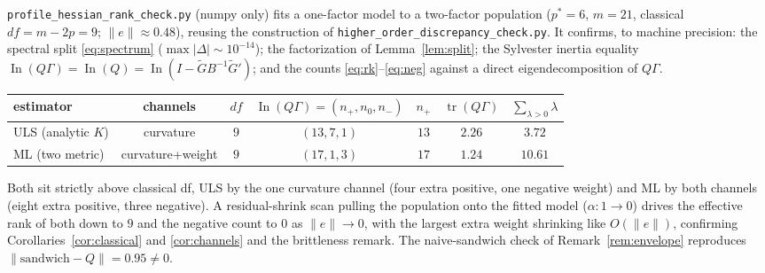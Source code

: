 \documentclass[11pt]{article}
\newcommand{\tr}{\operatorname{tr}}
\newcommand{\In}{\operatorname{In}}
\newcommand{\np}{n_{+}}
\newcommand{\nz}{n_{0}}
\newcommand{\nm}{n_{-}}
\theoremstyle{plain}
\theoremstyle{remark}
\begin{document}
\texttt{profile\_hessian\_rank\_check.py} (numpy only) fits a one-factor model to
a two-factor population ($p^\ast=6$, $m=21$, classical $df=m-2p=9$;
$\lVert e\rVert\approx0.48$), reusing the construction of
\texttt{higher\_order\_discrepancy\_check.py}. It confirms, to machine precision:
the spectral split \eqref{eq:spectrum} ($\max|\Delta|\sim10^{-14}$); the
factorization of Lemma~\ref{lem:split}; the Sylvester inertia equality
$\In(Q\Gamma)=\In(Q)=\In(I-\tilde G B^{-1}\tilde G')$; and the counts
\eqref{eq:rk}--\eqref{eq:neg} against a direct eigendecomposition of $Q\Gamma$.

\begin{center}
\begin{tabular}{lcccccc}
estimator & channels & $df$ & $\In(Q\Gamma)=(\np,\nz,\nm)$ & $\np$ & $\tr(Q\Gamma)$ & $\sum_{\lambda>0}\lambda$\\\hline
ULS (analytic $K$) & curvature      & $9$ & $(13,7,1)$ & $13$ & $2.26$ & $3.72$\\
ML  (two metric)   & curvature+weight & $9$ & $(17,1,3)$ & $17$ & $1.24$ & $10.61$\\
\end{tabular}
\end{center}

Both sit strictly above classical df, ULS by the one curvature channel (four
extra positive, one negative weight) and ML by both channels (eight extra
positive, three negative). A residual-shrink scan pulling the population onto the
fitted model ($\alpha:1\to0$) drives the effective rank of both down to $9$ and
the negative count to $0$ as $\lVert e\rVert\to0$, with the largest extra weight
shrinking like $O(\lVert e\rVert)$, confirming Corollaries~\ref{cor:classical}
and \ref{cor:channels} and the brittleness remark. The naive-sandwich check of
Remark~\ref{rem:envelope} reproduces $\lVert\text{sandwich}-Q\rVert=0.95\neq0$.
\end{document}
